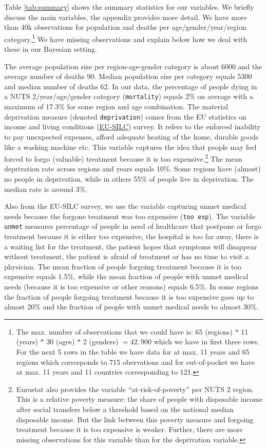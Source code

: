 \documentclass[a4paper,12pt]{article}
\begin{document}
Table \ref{tab:summary} shows the summary statistics for our variables. We briefly discuss the main variables, the appendix provides more detail. We have more than 40k observations for population and deaths per age/gender/year/region category.\footnote{The max. number of observations that we could have is: 65 (regions) \(*\) 11 (years) \(*\) 30 (ages) \(*\) 2 (genders) \(=42,900\) which we have in first three rows. For the next 5 rows in the table we have data for at max. 11 years and 65 regions which corresponds to 715 obervations and for out-of-pocket we have at max. 11 years and 11 countries corresponding to 121.} We have missing observations and explain below how we deal with these in our Bayesian setting.

The average population size per region-age-gender category is about 6000 and the average number of deaths 90. Median population size per category equals 5300 and median number of deaths 62. In our data, the percentage of people dying in a NUTS 2/year/age/gender category (\texttt{mortality}) equals 2\% on average with a maximum of 17.3\% for some region and age combination. The material deprivation measure (denoted \texttt{deprivation}) comes from the EU statistics on income and living conditions (\href{https://ec.europa.eu/eurostat/statistics-explained/index.php?title=Glossary:EU\_statistics\_on\_income\_and\_living\_conditions\_(EU-SILC)}{EU-SILC}) survey. It refers to the enforced inability to pay unexpected expenses, afford adequate heating of the home, durable goods like a washing machine etc. This variable captures the idea that people may feel forced to forgo (valuable) treatment because it is too expensive.\footnote{Eurostat also provides the variable ``at-risk-of-poverty'' per NUTS 2 region. This is a relative poverty measure: the share of people with disposable income after social transfers below a threshold based on the national median disposable income. But the link between this poverty measure and forgoing treatment because it is too expensive is weaker. Further, there are more missing observations for this variable than for the deprivation variable.} The mean deprivation rate across regions and years equals 10\%. Some regions have (almost) no people in deprivation, while in others 55\% of people live in deprivation. The median rate is around 3\%.

Also from the EU-SILC survey, we use the variable capturing unmet medical needs because the forgone treatment was too expensive (\texttt{too exp}). The variable \texttt{unmet} measures percentage of people in need of healthcare that postpone or forgo treatment because it is either too expensive, the hospital is too far away, there is a waiting list for the treatment, the patient hopes that symptoms will disappear without treatment, the patient is afraid of treatment or has no time to visit a physician. The mean fraction of people forgoing treatment because it is too expensive equals 1.5\%, while the mean fraction of people with unmet medical needs (because it is too expensive or other reasons) equals 6.5\%. In some regions the fraction of people forgoing treatment because it is too expensive goes up to almost 20\% and the fraction of people with unmet medical needs to almost 30\%.
\end{document}

